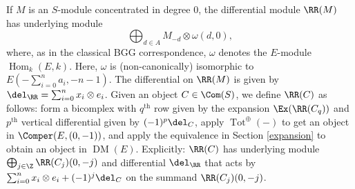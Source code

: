 \documentclass[12pt]{amsart}
\theoremstyle{definition}
\theoremstyle{remark}
\newcommand{\Hom}{\operatorname{Hom}} %
\def\on{\operatorname}
\def\DM{\operatorname{DM}}
\def\th{\on{th}}
\def\o{\omega}
\begin{document}
If $M$ is an $S$-module concentrated in degree 0, the differential module $\RR(M)$ has underlying module
$$
\bigoplus_{d \in A} M_{-d} \otimes \o(d, 0),
$$
where, as in the classical BGG correspondence, $\o$ denotes the $E$-module $\Hom_k(E, k)$. Here, $\o$ is (non-canonically) isomorphic to $E(-\sum_{i = 0}^n a_i, -n-1)$. The differential on $\RR(M)$ is given by $\del_\RR = \sum_{i = 0}^n x_i \otimes e_i$.
Given an object $C \in \Com(S)$, we define $\RR(C)$ as follows: form a bicomplex with $q^{\th}$ row given by the expansion $\Ex(\RR(C_q))$ and $p^{\th}$ vertical differential given by $(-1)^p\del_C$, apply $\on{Tot}^{\oplus}( - )$ to get an object in $\Comper(E, (0,-1))$, and apply the equivalence in Section \ref{expansion} to obtain an object in $\DM(E)$. Explicitly: $\RR(C)$ has underlying module $\bigoplus_{j \in \Z} \RR(C_j)(0, -j)$ and differential $\del_\RR$ that acts by $ \sum_{i = 0}^n x_i \otimes e_i + (-1)^j\del_C$ on the summand $\RR(C_j)(0, -j)$.

\iffalse
\begin{equation}
\label{bicomplex}
\xymatrix{ 
& \ar[d]^-{\del}   & \ar[d]^-{\del}   & \\
\cdots & \RR(C_q)_p\ar[l]  \ar[d]^-{ \del}     & \RR(C_{q})_{p+1}   \ar[d]^-{ \del}  \ar[l]& \cdots \ar[l]\\
\cdots & \RR(C_{q - 1})_p\ar[d]^-{\del} \ar[l] &  \RR(C_{q -1})_{p+1} \ar[d]^-{\del}  \ar[l]& \ar[l]\cdots \\
&&&
}
\end{equation}
\fi
\end{document}
